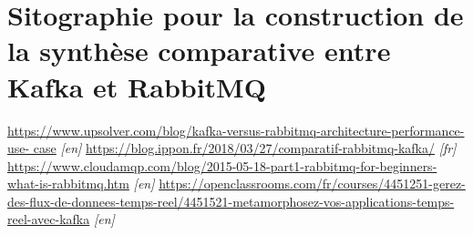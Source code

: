 \documentclass{article}
\begin{document}
\section{Sitographie pour la construction de la synthèse comparative entre Kafka et RabbitMQ}\label{ann:kafkarabbitmq}
	\hspace*{-0.5cm}\href{https://www.upsolver.com/blog/kafka-versus-rabbitmq-architecture-performance-use-
	case}{https://www.upsolver.com/blog/kafka-versus-rabbitmq-architecture-performance-use-
	case} \textit{[en]} \medskip\newline
	\href{https://blog.ippon.fr/2018/03/27/comparatif-rabbitmq-kafka/}{https://blog.ippon.fr/2018/03/27/comparatif-rabbitmq-kafka/} \textit{[fr]}\medskip\newline
	\href{https://www.cloudamqp.com/blog/2015-05-18-part1-rabbitmq-for-beginners-what-is-rabbitmq.htm}{https://www.cloudamqp.com/blog/2015-05-18-part1-rabbitmq-for-beginners-what-is-rabbitmq.htm} \textit{[en]}\medskip\newline
	\href{https://openclassrooms.com/fr/courses/4451251-gerez-des-flux-de-donnees-temps-reel/4451521-metamorphosez-vos-applications-temps-reel-avec-kafka}{https://openclassrooms.com/fr/courses/4451251-gerez-des-flux-de-donnees-temps-reel/4451521-metamorphosez-vos-applications-temps-reel-avec-kafka} \textit{[en]}
\end{document}
